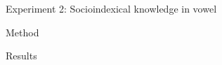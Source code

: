 \documentclass[final,hyperref={pdfpagelabels=false}]{beamer}
\begin{document}
\begin{frame}[t]
\begin{columns}[t]
\begin{column}{.38\textwidth}

\end{column} %
\begin{column}{.38\textwidth} %




\begin{block}{Experiment 2: Socioindexical knowledge in vowel}
\end{block}
\begin{block}{Method}
\vspace*{0.2cm}
\end{block}



\begin{block}{Results}
\end{block}




\end{column} %

\begin{column}{.001\textwidth}\end{column} %

\end{columns} %


\end{frame} %
\end{document}
